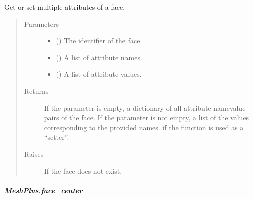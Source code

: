 \documentclass[letterpaper,10pt,english]{sphinxmanual}
\begin{document}
\begin{fulllineitems}
\begin{fulllineitems}
\label{\detokenize{api/generated/directional_clustering.mesh.MeshPlus.face_attributes:directional_clustering.mesh.MeshPlus.face_attributes}}
Get or set multiple attributes of a face.
\begin{quote}\begin{description}
\item[{Parameters}] \leavevmode\begin{itemize}
\item {} 
 () \textendash{} The identifier of the face.

\item {} 
 () \textendash{} A list of attribute names.

\item {} 
 () \textendash{} A list of attribute values.

\end{itemize}

\item[{Returns}] \leavevmode
{} \textendash{} If the parameter  is empty,
a dictionary of all attribute name\sphinxhyphen{}value pairs of the face.
If the parameter  is not empty,
a list of the values corresponding to the provided names.
 if the function is used as a “setter”.

\item[{Raises}] \leavevmode
{} \textendash{} If the face does not exist.

\end{description}\end{quote}

\end{fulllineitems}



\subparagraph{MeshPlus.face\_center}
\label{\detokenize{api/generated/directional_clustering.mesh.MeshPlus.face_center:meshplus-face-center}}\label{\detokenize{api/generated/directional_clustering.mesh.MeshPlus.face_center::doc}}


\end{fulllineitems}
\end{document}
